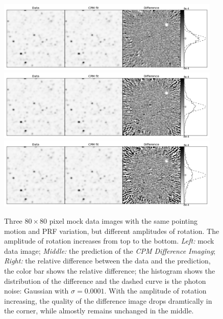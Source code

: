 \documentclass[12pt, preprint]{aastex}
\newcommand{\project}[1]{\textsl{#1}}
\newcommand{\cpmdiff}{\project{CPM Difference Imaging}}
\begin{document}
\begin{figure}[p]
\begin{center}
\includegraphics[width=0.95\textwidth]{f8a}
\includegraphics[width=0.95\textwidth]{f8b}
\includegraphics[width=0.95\textwidth]{f8c}
\end{center}
\caption{
  \label{large_rotation}
  Three $80\times 80$ pixel mock data images with the same pointing motion and PRF variation, but different amplitudes of rotation. The amplitude of rotation increases from top to the bottom.
  \emph{Left:} mock data image;
  \emph{Middle:} the prediction of the \cpmdiff;
  \emph{Right:} the relative difference between the data and the prediction, the color bar shows the relative difference; the histogram shows the distribution of the difference and the dashed curve is the photon noise: Gaussian with $\sigma = 0.0001$. 
  With the amplitude of rotation increasing, the quality of the difference image drops dramtically in the corner, while almostly remains unchanged in the middle.
}
\end{figure}
\end{document}

